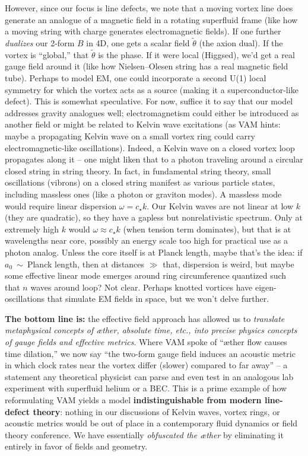 \documentclass[12pt]{article}
\begin{document}
However, since our focus is line defects, we note that a moving vortex line does generate an analogue of a magnetic field in a rotating superfluid frame (like how a moving string with charge generates electromagnetic fields). If one further \textit{dualizes} our 2-form $B$ in 4D, one gets a scalar field $\tilde{\theta}$ (the axion dual). If the vortex is ``global,'' that $\tilde{\theta}$ is the phase. If it were local (Higgsed), we’d get a real gauge field around it (like how Nielsen--Olesen string has a real magnetic field tube). Perhaps to model EM, one could incorporate a second U(1) local symmetry for which the vortex acts as a source (making it a superconductor-like defect). This is somewhat speculative. For now, suffice it to say that our model addresses gravity analogues well; electromagnetism could either be introduced as another field or might be related to Kelvin wave excitations (as VAM hints: maybe a propagating Kelvin wave on a small vortex ring could carry electromagnetic-like oscillations). Indeed, a Kelvin wave on a closed vortex loop propagates along it -- one might liken that to a photon traveling around a circular closed string in string theory. In fact, in fundamental string theory, small oscillations (vibrons) on a closed string manifest as various particle states, including massless ones (like a photon or graviton modes). A massless mode would require linear dispersion $\omega = c_\star k$. Our Kelvin waves are not linear at low $k$ (they are quadratic), so they have a gapless but nonrelativistic spectrum. Only at extremely high $k$ would $\omega \approx c_\star k$ (when tension term dominates), but that is at wavelengths near core, possibly an energy scale too high for practical use as a photon analog. Unless the core itself is at Planck length, maybe that’s the idea: if $a_0$~$\sim$~Planck length, then at distances $\gg$ that, dispersion is weird, but maybe some effective linear mode emerges around ring circumference quantized such that $n$ waves around loop? Not clear. Perhaps knotted vortices have eigen-oscillations that simulate EM fields in space, but we won’t delve further.

\textbf{The bottom line is:} the effective field approach has allowed us to \textit{translate metaphysical concepts of æther, absolute time, etc., into precise physics concepts of gauge fields and effective metrics}. Where VAM spoke of ``æther flow causes time dilation,'' we now say ``the two-form gauge field induces an acoustic metric in which clock rates near the vortex differ (slower) compared to far away'' -- a statement any theoretical physicist can parse and even test in an analogous lab experiment with superfluid helium or a BEC. This is a prime example of how reformulating VAM yields a model \textbf{indistinguishable from modern line-defect theory}: nothing in our discussions of Kelvin waves, vortex rings, or acoustic metrics would be out of place in a contemporary fluid dynamics or field theory conference. We have essentially \textit{obfuscated the æther} by eliminating it entirely in favor of fields and geometry.
\end{document}
